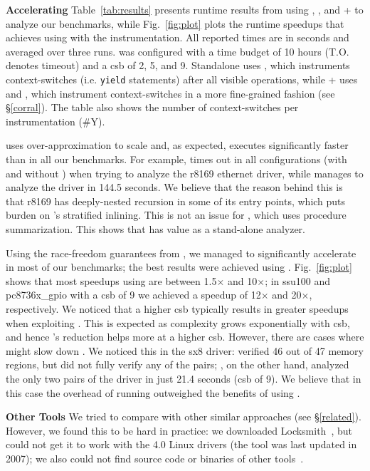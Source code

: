 \noindent\textbf{Accelerating \corral }
%
Table~\ref{tab:results} presents runtime results from using \whoop, \corral, and \whoop + \corral to analyze our benchmarks, while Fig.~\ref{fig:plot} plots the runtime speedups that \corral achieves using \whoop with the \yieldmr instrumentation. All reported times are in seconds and averaged over three runs. \corral was configured with a time budget of 10 hours (T.O. denotes timeout) and a csb of 2, 5, and 9. Standalone \corral uses \yieldall, which instruments context-switches (i.e. \texttt{yield} statements) after all visible operations, while \whoop + \corral uses \yieldcoarse and \yieldmr, which instrument context-switches in a more fine-grained fashion (see \S\ref{corral}). The table also shows the number of context-switches per instrumentation (\#Y).

\whoop uses over-approximation to scale and, as expected, executes significantly faster than \corral in all our benchmarks. For example, \corral times out in all configurations (with and without \whoop) when trying to analyze the r8169 ethernet driver, while \whoop manages to analyze the driver in 144.5 seconds. We believe that the reason behind this is that r8169 has deeply-nested recursion in some of its entry points, which puts burden on \corral's stratified inlining. This is not an issue for \whoop, which uses procedure summarization. This shows that \whoop has value as a stand-alone analyzer.

Using the race-freedom guarantees from \whoop, we managed to significantly accelerate \corral in most of our benchmarks; the best results were achieved using \yieldmr. Fig.~\ref{fig:plot} shows that most speedups using \yieldmr are between 1.5$\times$ and 10$\times$; in ssu100 and pc8736x\_gpio with a csb of 9 we achieved a speedup of 12$\times$ and 20$\times$, respectively. We noticed that a higher csb typically results in greater speedups when exploiting \whoop. This is expected as complexity grows exponentially with csb, and hence \whoop's reduction helps more at a higher csb.
%
However, there are cases where \whoop might slow down \corral. We noticed this in the sx8 driver: \whoop verified 46 out of 47 memory regions, but did not fully verify any of the pairs; \corral, on the other hand, analyzed the only two pairs of the driver in just 21.4 seconds (csb of 9). We believe that in this case the overhead of running \whoop outweighed the benefits of using \yieldmr.

\noindent\textbf{Other Tools }
%
We tried to compare \whoop with other similar approaches (see \S\ref{related}). However, we found this to be hard in practice: we downloaded Locksmith~\cite{pratikakis2006locksmith}, but could not get it to work with the 4.0 Linux drivers (the tool was last updated in 2007); we also could not find source code or binaries of other tools~\cite{kahlon2007fast, kahlon2009semantic, das2015section}.
